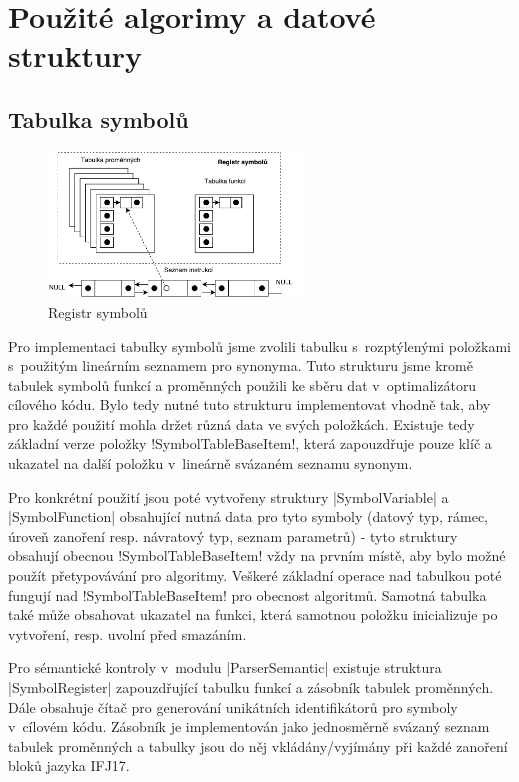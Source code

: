 \section{Použité algorimy a datové struktury}

\subsection{Tabulka symbolů}

\begin{figure}[htbp]
    \centering
    \includegraphics[width=0.6\textwidth, angle=0]{src/assets/symbol_table.pdf}
    \caption{Registr symbolů}
	\vspace*{-10pt}
\end{figure}

Pro implementaci tabulky symbolů jsme zvolili tabulku s~rozptýlenými položkami s~použitým lineárním seznamem pro synonyma.
Tuto strukturu jsme kromě tabulek symbolů funkcí a proměnných použili ke sběru dat v~optimalizátoru cílového kódu. Bylo tedy nutné tuto strukturu implementovat vhodně tak, aby pro každé použití mohla držet různá data ve svých položkách. Existuje tedy základní verze položky \ic!SymbolTableBaseItem!, která zapouzdřuje pouze klíč a ukazatel na další položku v~lineárně svázaném seznamu synonym.

Pro konkrétní použití jsou poté vytvořeny struktury \ic|SymbolVariable| a \ic|SymbolFunction| obsahující nutná data pro tyto symboly (datový typ, rámec, úroveň zanoření resp. návratový typ, seznam parametrů) - tyto struktury obsahují obecnou \ic!SymbolTableBaseItem! vždy na prvním místě, aby bylo možné použít přetypovávání pro algoritmy. Veškeré základní operace nad tabulkou poté fungují nad \ic!SymbolTableBaseItem! pro obecnost algoritmů. Samotná tabulka také může obsahovat ukazatel na funkci, která samotnou položku inicializuje po vytvoření, resp. uvolní před smazáním.

Pro sémantické kontroly v~modulu \ic|ParserSemantic| existuje struktura \ic|SymbolRegister| zapouzdřující tabulku funkcí a zásobník tabulek proměnných. Dále obsahuje čítač pro generování unikátních identifikátorů pro symboly v~cílovém kódu. Zásobník je implementován jako jednosměrně svázaný seznam tabulek proměnných a tabulky jsou do něj vkládány/vyjímány při každé zanoření bloků jazyka IFJ17.

